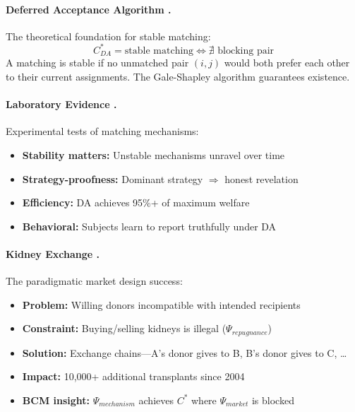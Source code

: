 \paragraph{Deferred Acceptance Algorithm \citep{gale1962college,roth1984evolution}.}
The theoretical foundation for stable matching:
\begin{equation}
C^*_{DA} = \text{stable matching} \Leftrightarrow \nexists \text{ blocking pair}
\tag{EV-DA}
\end{equation}
A matching is stable if no unmatched pair $(i, j)$ would both prefer each other
to their current assignments. The Gale-Shapley algorithm guarantees existence.

\paragraph{Laboratory Evidence \citep{roth1991game}.}
Experimental tests of matching mechanisms:
\begin{itemize}[nosep]
    \item \textbf{Stability matters:} Unstable mechanisms unravel over time
    \item \textbf{Strategy-proofness:} Dominant strategy $\Rightarrow$ honest revelation
    \item \textbf{Efficiency:} DA achieves 95\%+ of maximum welfare
    \item \textbf{Behavioral:} Subjects learn to report truthfully under DA
\end{itemize}

\paragraph{Kidney Exchange \citep{roth2004kidney,roth2007kidney}.}
The paradigmatic market design success:
\begin{itemize}[nosep]
    \item \textbf{Problem:} Willing donors incompatible with intended recipients
    \item \textbf{Constraint:} Buying/selling kidneys is illegal ($\Psi_{repugnance}$)
    \item \textbf{Solution:} Exchange chains---A's donor gives to B, B's donor gives to C, \ldots
    \item \textbf{Impact:} 10,000+ additional transplants since 2004
    \item \textbf{BCM insight:} $\Psi_{mechanism}$ achieves $C^*$ where $\Psi_{market}$ is blocked
\end{itemize}

